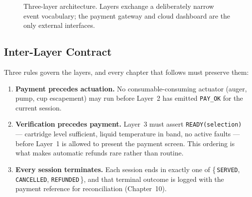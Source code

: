 \begin{figure}[htbp]
\caption{Three-layer architecture. Layers exchange a deliberately narrow
event vocabulary; the payment gateway and cloud dashboard are the only
external interfaces.}
\label{fig:threelayer}
\end{figure}

\subsection{Inter-Layer Contract}
\label{sec:contract}

Three rules govern the layers, and every chapter that follows must preserve
them:

\begin{enumerate}[label=\textbf{R\arabic*.}, itemsep=2pt]
  \item \textbf{Payment precedes actuation.} No consumable-consuming
        actuator (auger, pump, cup escapement) may run before Layer~2 has
        emitted \texttt{PAY\_OK} for the current session.
  \item \textbf{Verification precedes payment.} Layer~3 must assert
        \texttt{READY(selection)} --- cartridge level sufficient, liquid
        temperature in band, no active faults --- before Layer~1 is allowed
        to present the payment screen. This ordering is what makes automatic
        refunds rare rather than routine.
  \item \textbf{Every session terminates.} Each session ends in exactly one
        of \{\,\texttt{SERVED}, \texttt{CANCELLED},
        \texttt{REFUNDED}\,\}, and that terminal outcome is logged with the
        payment reference for reconciliation (Chapter~10).
\end{enumerate}

